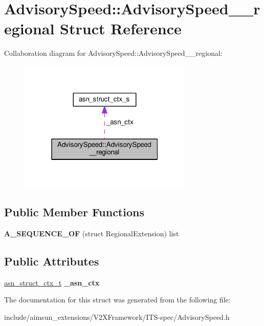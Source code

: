 \hypertarget{structAdvisorySpeed_1_1AdvisorySpeed____regional}{}\section{Advisory\+Speed\+:\+:Advisory\+Speed\+\_\+\+\_\+regional Struct Reference}
\label{structAdvisorySpeed_1_1AdvisorySpeed____regional}


Collaboration diagram for Advisory\+Speed\+:\+:Advisory\+Speed\+\_\+\+\_\+regional\+:\nopagebreak
\begin{figure}[H]
\begin{center}
\leavevmode
\includegraphics[width=235pt]{structAdvisorySpeed_1_1AdvisorySpeed____regional__coll__graph}
\end{center}
\end{figure}
\subsection*{Public Member Functions}
\begin{DoxyCompactItemize}
\item 
{\bfseries A\+\_\+\+S\+E\+Q\+U\+E\+N\+C\+E\+\_\+\+OF} (struct Regional\+Extension) list\hypertarget{structAdvisorySpeed_1_1AdvisorySpeed____regional_a65efef43fa873a07fb456e4ca2afb96c}{}\label{structAdvisorySpeed_1_1AdvisorySpeed____regional_a65efef43fa873a07fb456e4ca2afb96c}

\end{DoxyCompactItemize}
\subsection*{Public Attributes}
\begin{DoxyCompactItemize}
\item 
\hyperlink{structasn__struct__ctx__s}{asn\+\_\+struct\+\_\+ctx\+\_\+t} {\bfseries \+\_\+asn\+\_\+ctx}\hypertarget{structAdvisorySpeed_1_1AdvisorySpeed____regional_a63aed415ac6943050e04923709d349ee}{}\label{structAdvisorySpeed_1_1AdvisorySpeed____regional_a63aed415ac6943050e04923709d349ee}

\end{DoxyCompactItemize}


The documentation for this struct was generated from the following file\+:\begin{DoxyCompactItemize}
\item 
include/aimsun\+\_\+extensions/\+V2\+X\+Framework/\+I\+T\+S-\/spec/Advisory\+Speed.\+h\end{DoxyCompactItemize}
